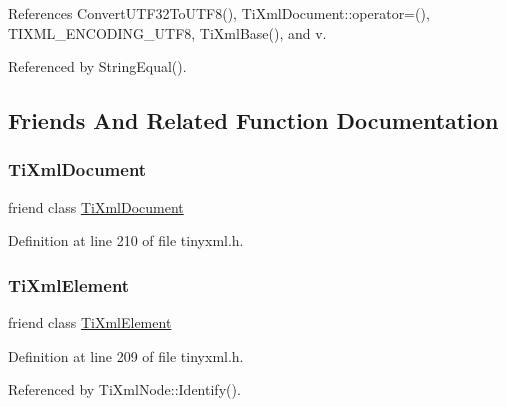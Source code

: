 References Convert\+U\+T\+F32\+To\+U\+T\+F8(), Ti\+Xml\+Document\+::operator=(), T\+I\+X\+M\+L\+\_\+\+E\+N\+C\+O\+D\+I\+N\+G\+\_\+\+U\+T\+F8, Ti\+Xml\+Base(), and v.



Referenced by String\+Equal().



\subsection{Friends And Related Function Documentation}
\hypertarget{class_ti_xml_base_a173617f6dfe902cf484ce5552b950475}{}\label{class_ti_xml_base_a173617f6dfe902cf484ce5552b950475} 
\subsubsection{\texorpdfstring{Ti\+Xml\+Document}{TiXmlDocument}}
{\footnotesize\ttfamily friend class \hyperlink{class_ti_xml_document}{Ti\+Xml\+Document}\hspace{0.3cm}{\ttfamily [friend]}}



Definition at line 210 of file tinyxml.\+h.

\hypertarget{class_ti_xml_base_ab6592e32cb9132be517cc12a70564c4b}{}\label{class_ti_xml_base_ab6592e32cb9132be517cc12a70564c4b} 
\subsubsection{\texorpdfstring{Ti\+Xml\+Element}{TiXmlElement}}
{\footnotesize\ttfamily friend class \hyperlink{class_ti_xml_element}{Ti\+Xml\+Element}\hspace{0.3cm}{\ttfamily [friend]}}



Definition at line 209 of file tinyxml.\+h.



Referenced by Ti\+Xml\+Node\+::\+Identify().

\hypertarget{class_ti_xml_base_a218872a0d985ae30e78c55adc4bdb196}{}\label{class_ti_xml_base_a218872a0d985ae30e78c55adc4bdb196} 
